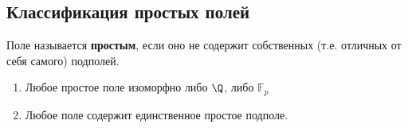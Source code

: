 \subsection{Классификация простых полей}

\begin{conj}
    Поле называется \textbf{простым}, если оно не содержит собственных (т.е. отличных от себя самого) подполей.
\end{conj}

\begin{theorem-non}
    \begin{enumerate}
        \item Любое простое поле изоморфно либо $\Q$, либо $\mathbb{F}_p$
        \item Любое поле содержит единственное простое подполе.
    \end{enumerate}
\end{theorem-non}
